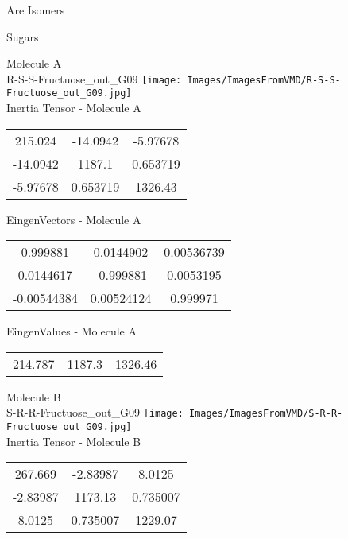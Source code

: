 \begin{center}
\vtab
\vtab
\textcolor{NavyBlue}{\Large Are Isomers}
\end{center}
\newpage

\vtab[-2cm]
\begin{center}
{\large Sugars}
\end{center}
\begin{multicols}{2}
\begin{center}
Molecule A \\ 
R-S-S-Fructuose\_out\_G09
\texttt{[image: Images/ImagesFromVMD/R-S-S-Fructuose\_out\_G09.jpg]}
\\
Inertia Tensor - Molecule A \\
\vtab
\begin{tabular}{|c c c|}
215.024	 & 	-14.0942	 & 	-5.97678	 \\
-14.0942	 & 	1187.1	 & 	0.653719	 \\
-5.97678	 & 	0.653719	 & 	1326.43
\end{tabular}

\vtab
 EingenVectors - Molecule A     \\
\vtab
\begin{tabular}{|c c c|}
0.999881	 & 	0.0144902	 & 	0.00536739	 \\
0.0144617	 & 	-0.999881	 & 	0.0053195	 \\
-0.00544384	 & 	0.00524124	 & 	0.999971
\end{tabular}

\vtab
 EingenValues - Molecule A     \\
\vtab
\begin{tabular}{|c c c|}
214.787	 & 	1187.3	 & 	1326.46
\end{tabular}
\columnbreak

Molecule B \\ 
S-R-R-Fructuose\_out\_G09
\texttt{[image: Images/ImagesFromVMD/S-R-R-Fructuose\_out\_G09.jpg]}
\\
Inertia Tensor - Molecule B \\
\vtab
\begin{tabular}{|c c c|}
267.669	 & 	-2.83987	 & 	8.0125	 \\
-2.83987	 & 	1173.13	 & 	0.735007	 \\
8.0125	 & 	0.735007	 & 	1229.07
\end{tabular}


\end{center}
\end{multicols}
